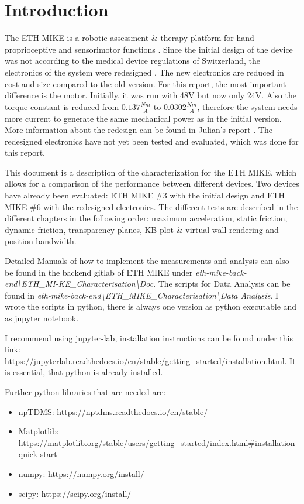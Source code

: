 \section{Introduction}

The ETH MIKE is a robotic assessment \& therapy platform for hand proprioceptive and sensorimotor functions \cite{icorr}. Since the initial design of the device was not according to the medical device regulations of Switzerland, the electronics of the system were redesigned \cite{julian}. The new electronics are reduced in cost and size compared to the old version. For this report, the most important difference is the motor. Initially, it was run with 48V but now only 24V. Also the torque constant is reduced from $0.137\frac{Nm}{A}$ to $0.0302\frac{Nm}{A}$, therefore the system needs more current to generate the same mechanical power as in the initial version. More information about the redesign can be found in Julian's report \cite{julian}. The redesigned electronics have not yet been tested and evaluated, which was done for this report.

This document is a description of the characterization for the ETH MIKE, which allows for a comparison of the performance between different devices. Two devices have already been evaluated: ETH MIKE \#3 with the initial design and ETH MIKE \#6 with the redesigned electronics. The different tests are described in the different chapters in the following order: maximum acceleration, static friction, dynamic friction, transparency planes, KB-plot \& virtual wall rendering and position bandwidth.

Detailed Manuals of how to implement the measurements and analysis can also be found in the backend gitlab of ETH MIKE under \emph{eth-mike-back-end\textbackslash ETH\_MI-KE\_Characterisation\textbackslash Doc}. The scripts for Data Analysis can be found in \emph{eth-mike-back-end\textbackslash ETH\_MIKE\_Characterisation\textbackslash Data Analysis}. I wrote the scripts in python, there is always one version as python executable and as jupyter notebook.

I recommend using jupyter-lab, installation instructions can be found under this link: \newline \url{https://jupyterlab.readthedocs.io/en/stable/getting_started/installation.html}. \newline It is essential, that python is already installed.

Further python libraries that are needed are:
\begin{itemize}
    \item npTDMS: \url{https://nptdms.readthedocs.io/en/stable/}
    \item Matplotlib: \url{https://matplotlib.org/stable/users/getting_started/index.html#installation-quick-start}
    \item numpy: \url{https://numpy.org/install/}
    \item scipy:
    \url{https://scipy.org/install/}
\end{itemize}